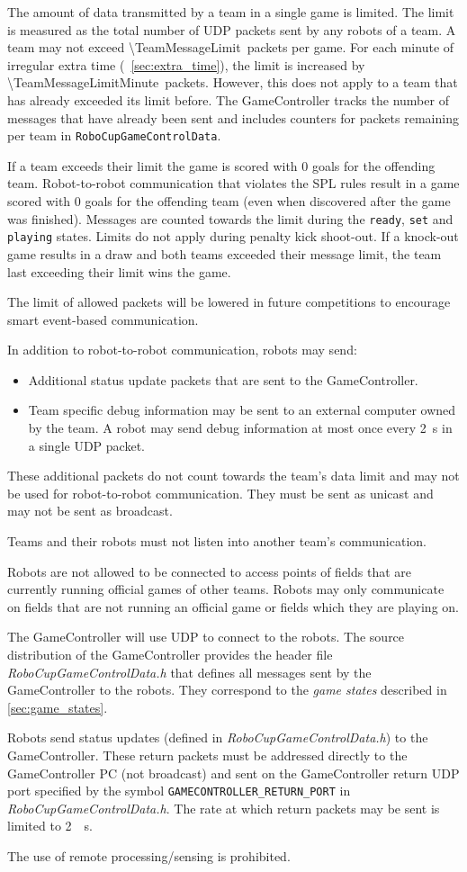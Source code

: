 The amount of data transmitted by a team in a single game is limited.
The limit is measured as the total number of UDP packets sent by any robots of a team.
A team may not exceed \qty{\TeamMessageLimit}{packets} per game.
For each minute of irregular extra time (\cf~\cref{sec:extra_time}), the limit is increased by \qty{\TeamMessageLimitMinute}{packets}.
However, this does not apply to a team that has already exceeded its limit before.
The GameController tracks the number of messages that have already been sent and includes counters for packets remaining per team in \texttt{RoboCupGameControlData}.

If a team exceeds their limit the game is scored with 0 goals for the offending team.
Robot-to-robot communication that violates the SPL rules result in a game scored with 0 goals for the offending team (even when discovered after the game was finished).
Messages are counted towards the limit during the \texttt{ready}, \texttt{set} and \texttt{playing} states.
Limits do not apply during penalty kick shoot-out.
If a knock-out game results in a draw and both teams exceeded their message limit, the team last exceeding their limit wins the game.

The limit of allowed packets will be lowered in future competitions to encourage smart event-based communication.

In addition to robot-to-robot communication, robots may send:
\begin{itemize}
 \item Additional status update packets that are sent to the GameController.
 \item Team specific debug information may be sent to an external computer owned by the team.
   A robot may send debug information at most once every \qty{2}{\second} in a single UDP packet.
\end{itemize}
These additional packets do not count towards the team's data limit and may not be used for robot-to-robot communication.
They must be sent as unicast and may not be sent as broadcast.

Teams and their robots must not listen into another team's communication.

Robots are not allowed to be connected to access points of fields that are currently running official games of other teams.
Robots may only communicate on fields that are not running an official game or fields which they are playing on.

The GameController will use UDP to connect to the robots.
The source distribution of the GameController provides the header file \emph{RoboCupGameControlData.h} that defines all messages sent by the GameController to the robots.
They correspond to the \emph{game states} described in \cref{sec:game_states}.

Robots send status updates (defined in \emph{RoboCupGameControlData.h}) to the GameController.
These return packets must be addressed directly to the GameController PC (\ie not broadcast) and sent on the GameController return UDP port specified by the symbol \verb!GAMECONTROLLER_RETURN_PORT! in \emph{RoboCupGameControlData.h}.
The rate at which return packets may be sent is limited to \qty{2}{\per\second}.

The use of remote processing/sensing is prohibited.
